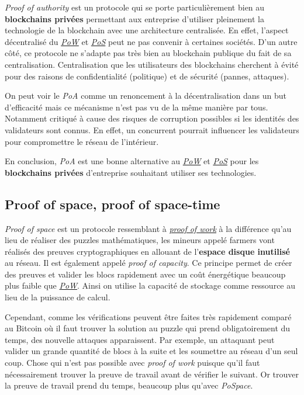 \textit{Proof of authority} est un protocole qui se porte particulièrement bien au \textbf{blockchains privées} permettant aux entreprise d'utiliser pleinement la technologie de la blockchain avec une architecture centralisée. En effet, l'aspect décentralisé du \hyperref[consensus:pow]{\textit{PoW}} et \hyperref[consensus:pos]{\textit{PoS}} peut ne pas convenir à certaines sociétés. D'un autre côté, ce protocole ne s'adapte pas très bien au blockchain publique du fait de sa centralisation. Centralisation que les utilisateurs des blockchains cherchent à évité pour des raisons de confidentialité (politique) et de sécurité (pannes, attaques).

On peut voir le \textit{PoA} comme un renoncement à la décentralisation dans un but d'efficacité mais ce mécanisme n'est pas vu de la même manière par tous. Notamment critiqué à cause des risques de corruption possibles si les identités des validateurs sont connus. En effet, un concurrent pourrait influencer les validateurs pour compromettre le réseau de l'intérieur.

En conclusion, \textit{PoA} est une bonne alternative au \hyperref[consensus:pow]{\textit{PoW}} et \hyperref[consensus:pos]{\textit{PoS}} pour les \textbf{blockchains privées} d'entreprise souhaitant utiliser ses technologies.

\subsection{Proof of space, proof of space-time}

\textit{Proof of space} est un protocole ressemblant à \hyperref[consensus:pow]{\textit{proof of work}} à la différence qu'au lieu de réaliser des puzzles mathématiques, les mineurs appelé farmers vont réalisés des preuves cryptographiques en allouant de l'\textbf{espace disque inutilisé} au réseau. Il est également appelé \textit{proof of capacity}. Ce principe permet de créer des preuves et valider les blocs rapidement avec un coût énergétique beaucoup plus faible que \hyperref[consensus:pow]{\textit{PoW}}. Ainsi on utilise la capacité de stockage comme ressource au lieu de la puissance de calcul.

Cependant, comme les vérifications peuvent être faites très rapidement comparé au Bitcoin où il faut trouver la solution au puzzle qui prend obligatoirement du temps, des nouvelle attaques apparaissent. Par exemple, un attaquant peut valider un grande quantité de blocs à la suite et les soumettre au réseau d'un seul coup. Chose qui n'est pas possible avec \textit{proof of work} puisque qu'il faut nécessairement trouver la preuve de travail avant de vérifier le suivant. Or trouver la preuve de travail prend du temps, beaucoup plus qu'avec \textit{PoSpace}. 

